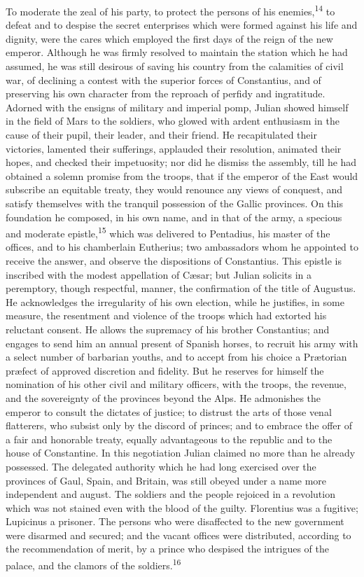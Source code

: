 To moderate the zeal of his party, to protect the persons of his
enemies,\textsuperscript{14} to defeat and to despise the secret enterprises which
were formed against his life and dignity, were the cares which
employed the first days of the reign of the new emperor. Although
he was firmly resolved to maintain the station which he had
assumed, he was still desirous of saving his country from the
calamities of civil war, of declining a contest with the superior
forces of Constantius, and of preserving his own character from
the reproach of perfidy and ingratitude. Adorned with the ensigns
of military and imperial pomp, Julian showed himself in the field
of Mars to the soldiers, who glowed with ardent enthusiasm in the
cause of their pupil, their leader, and their friend. He
recapitulated their victories, lamented their sufferings,
applauded their resolution, animated their hopes, and checked
their impetuosity; nor did he dismiss the assembly, till he had
obtained a solemn promise from the troops, that if the emperor of
the East would subscribe an equitable treaty, they would renounce
any views of conquest, and satisfy themselves with the tranquil
possession of the Gallic provinces. On this foundation he
composed, in his own name, and in that of the army, a specious
and moderate epistle,\textsuperscript{15} which was delivered to Pentadius, his
master of the offices, and to his chamberlain Eutherius; two
ambassadors whom he appointed to receive the answer, and observe
the dispositions of Constantius. This epistle is inscribed with
the modest appellation of Cæsar; but Julian solicits in a
peremptory, though respectful, manner, the confirmation of the
title of Augustus. He acknowledges the irregularity of his own
election, while he justifies, in some measure, the resentment and
violence of the troops which had extorted his reluctant consent.
He allows the supremacy of his brother Constantius; and engages
to send him an annual present of Spanish horses, to recruit his
army with a select number of barbarian youths, and to accept from
his choice a Prætorian præfect of approved discretion and
fidelity. But he reserves for himself the nomination of his other
civil and military officers, with the troops, the revenue, and
the sovereignty of the provinces beyond the Alps. He admonishes
the emperor to consult the dictates of justice; to distrust the
arts of those venal flatterers, who subsist only by the discord
of princes; and to embrace the offer of a fair and honorable
treaty, equally advantageous to the republic and to the house of
Constantine. In this negotiation Julian claimed no more than he
already possessed. The delegated authority which he had long
exercised over the provinces of Gaul, Spain, and Britain, was
still obeyed under a name more independent and august. The
soldiers and the people rejoiced in a revolution which was not
stained even with the blood of the guilty. Florentius was a
fugitive; Lupicinus a prisoner. The persons who were disaffected
to the new government were disarmed and secured; and the vacant
offices were distributed, according to the recommendation of
merit, by a prince who despised the intrigues of the palace, and
the clamors of the soldiers.\textsuperscript{16}

